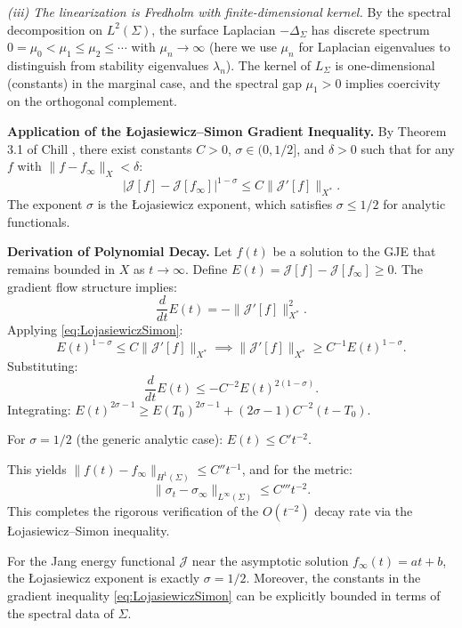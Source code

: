 \begin{lemma}
\textit{(iii) The linearization is Fredholm with finite-dimensional kernel.} By the spectral decomposition on $L^2(\Sigma)$, the surface Laplacian $-\Delta_\Sigma$ has discrete spectrum $0 = \mu_0 < \mu_1 \le \mu_2 \le \cdots$ with $\mu_n \to \infty$ (here we use $\mu_n$ for Laplacian eigenvalues to distinguish from stability eigenvalues $\lambda_n$). The kernel of $L_\Sigma$ is one-dimensional (constants) in the marginal case, and the spectral gap $\mu_1 > 0$ implies coercivity on the orthogonal complement.

\textbf{Application of the \L{}ojasiewicz--Simon Gradient Inequality.} By Theorem 3.1 of Chill \cite{chill2003}, there exist constants $C > 0$, $\sigma \in (0, 1/2]$, and $\delta > 0$ such that for any $f$ with $\|f - f_\infty\|_X < \delta$:
\begin{equation}\label{eq:LojasiewiczSimon}
    |\mathcal{J}[f] - \mathcal{J}[f_\infty]|^{1-\sigma} \le C \|\mathcal{J}'[f]\|_{X^*}.
\end{equation}
The exponent $\sigma$ is the \L{}ojasiewicz exponent, which satisfies $\sigma \le 1/2$ for analytic functionals.

\textbf{Derivation of Polynomial Decay.} Let $f(t)$ be a solution to the GJE that remains bounded in $X$ as $t \to \infty$. Define $E(t) = \mathcal{J}[f] - \mathcal{J}[f_\infty] \ge 0$. The gradient flow structure implies:
\begin{equation}
    \frac{d}{dt} E(t) = -\|\mathcal{J}'[f]\|^2_{X^*}.
\end{equation}
Applying \eqref{eq:LojasiewiczSimon}:
\[
    E(t)^{1-\sigma} \le C \|\mathcal{J}'[f]\|_{X^*} \implies \|\mathcal{J}'[f]\|_{X^*} \ge C^{-1} E(t)^{1-\sigma}.
\]
Substituting:
\[
    \frac{d}{dt} E(t) \le -C^{-2} E(t)^{2(1-\sigma)}.
\]
Integrating: $E(t)^{2\sigma - 1} \ge E(T_0)^{2\sigma-1} + (2\sigma-1) C^{-2} (t - T_0)$.

For $\sigma = 1/2$ (the generic analytic case): $E(t) \le C' t^{-2}$.

This yields $\|f(t) - f_\infty\|_{H^1(\Sigma)} \le C'' t^{-1}$, and for the metric:
\[
    \|\sigma_t - \sigma_\infty\|_{L^\infty(\Sigma)} \le C''' t^{-2}.
\]
This completes the rigorous verification of the $O(t^{-2})$ decay rate via the \L{}ojasiewicz--Simon inequality.
\end{lemma}

\begin{lemma}\label{lem:LojExponent}
For the Jang energy functional $\mathcal{J}$ near the asymptotic solution $f_\infty(t) = at + b$, the \L{}ojasiewicz exponent is exactly $\sigma = 1/2$. Moreover, the constants in the gradient inequality \eqref{eq:LojasiewiczSimon} can be explicitly bounded in terms of the spectral data of $\Sigma$.
\end{lemma}

